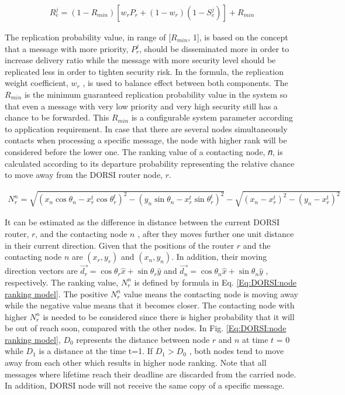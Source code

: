 \begin{eqnarray}
\label{Eq:DORSI:replication probability}
{ R }_{ e }^{ j }=(1-{ R }_{ min })[{ w }_{ r }{ P }_{ r }+(1-{ w }_{ r })(1-{ S }_{ e }^{ j })]+{ R }_{ min }
\end{eqnarray}

The replication probability value, in range of [${ R }_{ min }$, 1], is based on the concept that a message with
more priority, $P_r^j$, should be disseminated more in order to increase delivery ratio while the message with more security level should be replicated less in order to tighten security risk. 
In the formula, the replication weight coefficient, $w_r$ , is used to balance effect between both components. 
The ${ R }_{ min }$ is the minimum guaranteed replication probability value in the system so that even a message with very low priority and very high security still has a chance to be forwarded. 
This ${ R }_{ min }$ is a configurable system parameter according to application requirement.
In case that there are several nodes simultaneously contacts when processing a specific message, the node with higher rank will be considered before the lower one. 
The ranking value of a contacting node, 𝑛, is calculated according to its departure probability representing the relative chance to move away from the DORSI router node, $r$.

\begin{eqnarray}
\label{Eq:DORSI:node ranking model}
{ N }_{ r }^{ n }=\sqrt { { ({ x }_{ n }\cos { { \theta  }_{ n } } -{ x }_{ r }^{ t }\cos { { \theta  }_{ r }^{ t } } ) }^{ 2 }-{ ({ y }_{ n }\sin { { \theta  }_{ n } } -{ x }_{ r }^{ t }\sin { { \theta  }_{ r }^{ t } } ) }^{ 2 } } -\sqrt { { ({ x }_{ n }-{ x }_{ r }^{ t }) }^{ 2 }-{ ({ y }_{ n }-{ x }_{ r }^{ t }) }^{ 2 } } 
\end{eqnarray}

It can be estimated as the difference in distance between the current DORSI router, $r$, and the contacting node $n$ , after they moves further one unit distance in their current direction. 
Given that the positions of the router $r$ and the contacting node $n$ are $(x_r,y_r)$ and $(x_n,y_n)$. 
In addition, their moving direction vectors are 
$\vec { { d }_{ r } } =\cos { { \theta  }_{ r } } \hat { x } +\sin { { \theta  }_{ r } } \hat { y } $
and
$\vec { { d }_{ n } } =\cos { { \theta  }_{ n } } \hat { x } +\sin { { \theta  }_{ n } } \hat { y } $
, respectively. 
The ranking value, $N_{r}^n$ is defined by formula in Eq. \ref{Eq:DORSI:node ranking model}. 
The positive $N_{r}^n$ value means the contacting node is moving away while the negative value means that it becomes closer. 
The contacting node with higher $N_{r}^n$ is needed to be considered since there is higher probability that it will be out of reach soon, compared with the other nodes. 
In Fig. \ref{Eq:DORSI:node ranking model}, $D_0$ represents the distance between node $r$ and $n$ at time $t$ = 0 while $D_1$ is a distance at the time t=1. 
If $D_1 > D_0$ , both nodes tend to move away from each other which results in higher node ranking.
Note that all messages where lifetime reach their deadline are discarded from the carried node. 
In addition, DORSI node will not receive the same copy of a specific message.


